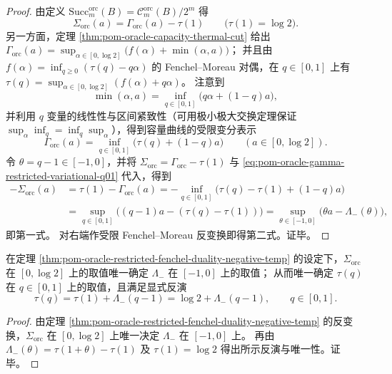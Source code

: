 \begin{proof}
由定义 \(\mathrm{Succ}^{\mathrm{orc}}_m(B)=\mathcal{C}^{\mathrm{orc}}_m(B)/2^m\) 得
\[
\Sigma_{\mathrm{orc}}(a)=\Gamma_{\mathrm{orc}}(a)-\tau(1)\qquad\bigl(\tau(1)=\log 2\bigr).
\]
另一方面，定理 \ref{thm:pom-oracle-capacity-thermal-cut} 给出
\(
\Gamma_{\mathrm{orc}}(a)=\sup_{\alpha\in[0,\log 2]}\bigl(f(\alpha)+\min(\alpha,a)\bigr)
\)；
并且由 \(f(\alpha)=\inf_{q\ge 0}(\tau(q)-q\alpha)\) 的 Fenchel--Moreau 对偶，在 \(q\in[0,1]\) 上有
\(
\tau(q)=\sup_{\alpha\in[0,\log 2]}(f(\alpha)+q\alpha)
\)。
注意到
\[
\min(\alpha,a)=\inf_{q\in[0,1]}\bigl(q\alpha+(1-q)a\bigr),
\]
并利用 \(q\) 变量的线性性与区间紧致性（可用极小极大交换定理保证 \(\sup_\alpha\inf_q=\inf_q\sup_\alpha\)），得到容量曲线的受限变分表示
\begin{equation}\label{eq:pom-oracle-gamma-restricted-variational-q01}
\boxed{\;
\Gamma_{\mathrm{orc}}(a)=\inf_{q\in[0,1]}\bigl(\tau(q)+(1-q)a\bigr)\qquad(a\in[0,\log 2]).\;}
\end{equation}
令 \(\theta=q-1\in[-1,0]\)，并将 \(\Sigma_{\mathrm{orc}}=\Gamma_{\mathrm{orc}}-\tau(1)\) 与 \eqref{eq:pom-oracle-gamma-restricted-variational-q01} 代入，得到
\[
\begin{aligned}
-\Sigma_{\mathrm{orc}}(a)
&=\tau(1)-\Gamma_{\mathrm{orc}}(a)
=-\inf_{q\in[0,1]}\bigl(\tau(q)-\tau(1)+(1-q)a\bigr)\\
&=\sup_{q\in[0,1]}\bigl((q-1)a-(\tau(q)-\tau(1))\bigr)
=\sup_{\theta\in[-1,0]}\bigl(\theta a-\Lambda_{-}(\theta)\bigr),
\end{aligned}
\]
即第一式。
对右端作受限 Fenchel--Moreau 反变换即得第二式。证毕。
\end{proof}

\begin{corollary}\label{cor:pom-oracle-sigma-determines-tau-on-01}
在定理 \ref{thm:pom-oracle-restricted-fenchel-duality-negative-temp} 的设定下，\(\Sigma_{\mathrm{orc}}\) 在 \([0,\log 2]\) 上的取值唯一确定 \(\Lambda_{-}\) 在 \([-1,0]\) 上的取值；
从而唯一确定 \(\tau(q)\) 在 \(q\in[0,1]\) 上的取值，且满足显式反演
\[
\boxed{\;
\tau(q)=\tau(1)+\Lambda_{-}(q-1)=\log 2+\Lambda_{-}(q-1),\qquad q\in[0,1].\;}
\]
\end{corollary}
\begin{proof}
由定理 \ref{thm:pom-oracle-restricted-fenchel-duality-negative-temp} 的反变换，\(\Sigma_{\mathrm{orc}}\) 在 \([0,\log 2]\) 上唯一决定 \(\Lambda_{-}\) 在 \([-1,0]\) 上。
再由 \(\Lambda_{-}(\theta)=\tau(1+\theta)-\tau(1)\) 及 \(\tau(1)=\log 2\) 得出所示反演与唯一性。证毕。
\end{proof}

